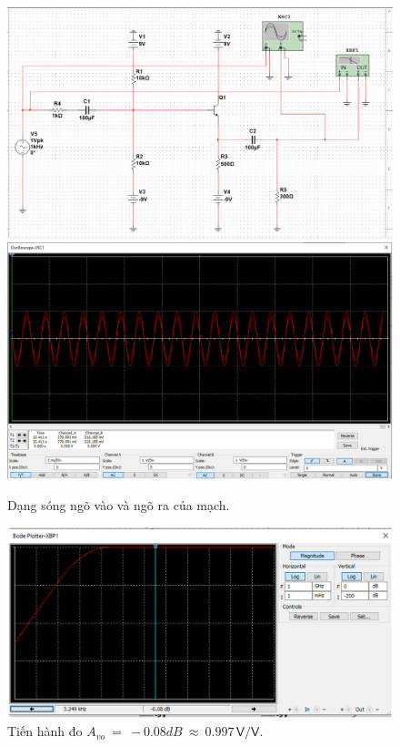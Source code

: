 \begin{figure}[H]
	\centering
	\includegraphics[width=\linewidth]{./my-chapters/my-images/Question3/b_dangsong.png}
	\includegraphics[width=\linewidth]{./my-chapters/my-images/Question3/b_dangwave.png}
	\caption{Dạng sóng ngõ vào và ngõ ra của mạch.}
\end{figure}

\begin{figure}[H]
	\centering
	\includegraphics[width=\linewidth]{./my-chapters/my-images/Question3/a_vo.png}
	\caption{Tiến hành đo $A_{vo}\ =\ -0.08dB\ \approx\ 0.997\,\textsf{V/V}$.}
\end{figure}

